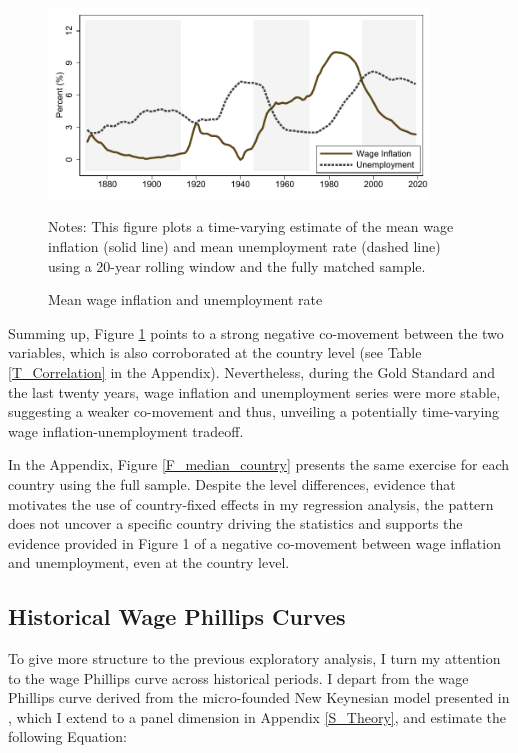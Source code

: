 \documentclass[12pt]{article}
\newcommand{\annote}[1]{\parbox{\textwidth}{\renewcommand{\baselinestretch}{1.0}\vspace{12pt} \footnotesize Notes: #1}}
\begin{document}
\begin{figure}[ht]
    \centering
    \caption{Mean wage inflation and unemployment rate}
    \includegraphics[width=0.9\textwidth]{../Output/Figures/Figure_1}
    \annote{\footnotesize This figure plots a time-varying estimate of the mean wage inflation (solid line) and mean unemployment rate (dashed line) using a 20-year rolling window and the fully matched sample.}
    \label{F_median}
\end{figure}

Summing up, Figure \ref{F_median} points to a strong negative co-movement between the two variables, which is also corroborated at the country level (see Table \ref{T_Correlation} in the Appendix). Nevertheless, during the Gold Standard and the last twenty years, wage inflation and unemployment series were more stable, suggesting a weaker co-movement and thus, unveiling a potentially time-varying wage inflation-unemployment tradeoff. 

In the Appendix, Figure \ref{F_median_country} presents the same exercise for each country using the full sample. Despite the level differences, evidence that motivates the use of country-fixed effects in my regression analysis, the pattern does not uncover a specific country driving the statistics and supports the evidence provided in Figure 1 of a negative co-movement between wage inflation and unemployment, even at the country level.

\subsection{Historical Wage Phillips Curves}

To give more structure to the previous exploratory analysis, I turn my attention to the wage Phillips curve across historical periods. I depart from the wage Phillips curve derived from the micro-founded New Keynesian model presented in \cite{Gali2011}, which I extend to a panel dimension in Appendix \ref{S_Theory}, and estimate the following Equation:
\end{document}
